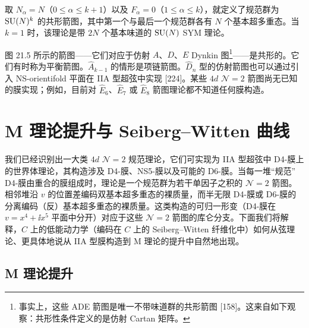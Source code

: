 
\begin{example}[21.6] 取 $N_\alpha=N$（$0\le\alpha\le k+1$）以及 $F_\alpha=0$（$1\le\alpha\le k$），就定义了规范群为 $\operatorname{SU}(N)^k$ 的共形箭图，其中第一个与最后一个规范群各有 $N$ 个基本超多重态。当 $k=1$ 时，该理论是带 $2N$ 个基本味道的 $\operatorname{SU}(N)$ SYM 理论。\end{example}


\begin{example}[21.7] 图 21.5 所示的箭图——它们对应于仿射 $A$、$D$、$E$ Dynkin 图\footnote{事实上，这些 ADE 箭图是唯一不带味道群的共形箭图 [158]。这来自如下观察：共形性条件定义的是仿射 Cartan 矩阵。}——是共形的。它们有时称为平衡箭图。$\widehat A_{k-1}$ 的情形是项链箭图。$\widehat D_n$ 型的仿射箭图也可以通过引入 NS-orientifold 平面在 IIA 型超弦中实现 [224]。某些 $4d$ $\mathcal{N}=2$ 箭图尚无已知的膜实现；例如，目前对 $\widehat E_6$、$\widehat E_7$ 或 $\widehat E_8$ 箭图理论都不知道任何膜构造。\end{example}

\section{M 理论提升与 Seiberg–Witten 曲线}

我们已经识别出一大类 $4d$ $\mathcal{N}=2$ 规范理论，它们可实现为 IIA 型超弦中 D4-膜上的世界体理论，其构造涉及 D4-膜、NS5-膜以及可能的 D6-膜。当每一堆“规范” D4-膜由重合的膜组成时，理论是一个规范群为若干单因子之积的 $\mathcal{N}=2$ 箭图。相邻堆沿 $v$ 的位置差编码双基本超多重态的裸质量，而半无限 D4-膜或 D6-膜的分离编码（反）基本超多重态的裸质量。这类构造的可归一形变（D4-膜在 $v=x^4+\ii x^5$ 平面中分开）对应于这些 $\mathcal{N}=2$ 箭图的库仑分支。下面我们将解释，$C$ 上的低能动力学（编码在 $C$ 上的 Seiberg–Witten 纤维化中）如何从弦理论、更具体地说从 IIA 型膜构造到 M 理论的提升中自然地出现。

\subsection{M 理论提升}

